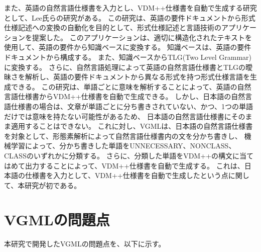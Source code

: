 また、英語の自然言語仕様書を入力とし、VDM++仕様書を自動で生成する研究として、Lee氏らの研究がある\cite{research3}。
この研究は、英語の要件ドキュメントから形式仕様記述への変換の自動化を目的として、形式仕様記述と言語技術のアプリケーションを提案した。
このアプリケーションは、適切に構造化されたテキストを使用して、英語の要件から知識ベースに変換する。
知識ベースは、英語の要件ドキュメントから構成する。
また、知識ベースからTLG(Two Level Grammar)に変換する。
さらに、自然言語処理によって英語の自然言語仕様書とTLGの曖昧さを解析し、英語の要件ドキュメントから異なる形式を持つ形式仕様言語を生成できる。
この研究は、単語ごとに意味を解析することによって、英語の自然言語仕様書からVDM++仕様書を自動で生成できる。
しかし、日本語の自然言語仕様書の場合は、文章が単語ごとに分ち書きされていない、かつ、1つの単語だけでは意味を持たない可能性があるため、
日本語の自然言語仕様書にそのまま適用することはできない。
これに対し、VGMLは、日本語の自然言語仕様書を対象として、形態素解析によって自然言語仕様書内の文を分かち書きし、
機械学習によって、分かち書きした単語をUNNECESSARY、NONCLASS、CLASSのいずれかに分類する。
さらに、分類した単語をVDM++の構文に当てはめて出力することによって、VDM++仕様書を自動で生成する。
これは、日本語の仕様書を入力として、VDM++仕様書を自動で生成したという点に関して、本研究が初である。

\section{VGMLの問題点}
本研究で開発したVGMLの問題点を、以下に示す。

